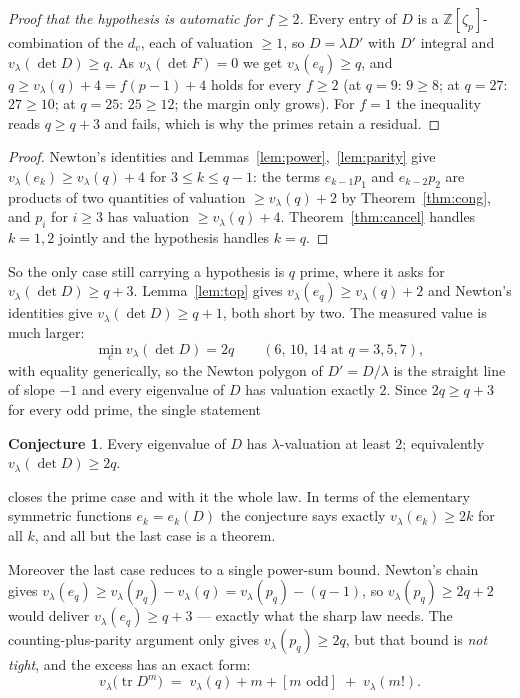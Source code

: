 \documentclass[11pt]{article}
\theoremstyle{plain}
\theoremstyle{definition}
\newtheorem{conjecture}[theorem]{Conjecture}
\newcommand{\ZZ}{\mathbb Z}
\newcommand{\tr}{\operatorname{tr}}
\newcommand{\vlam}{v_\lambda}
\begin{document}
\begin{proof}[Proof that the hypothesis is automatic for $f\ge2$]
Every entry of $D$ is a $\ZZ[\zeta_p]$-combination of the $d_v$, each of
valuation $\ge1$, so $D=\lambda D'$ with $D'$ integral and
$\vlam(\det D)\ge q$. As $\vlam(\det F)=0$ we get $\vlam(e_q)\ge q$, and
$q\ge \vlam(q)+4=f(p-1)+4$ holds for every $f\ge2$ (at $q=9$: $9\ge8$; at
$q=27$: $27\ge10$; at $q=25$: $25\ge12$; the margin only grows). For $f=1$ the
inequality reads $q\ge q+3$ and fails, which is why the primes retain a
residual.
\end{proof}

\begin{proof}
Newton's identities and Lemmas~\ref{lem:power},~\ref{lem:parity} give
$\vlam(e_k)\ge\vlam(q)+4$ for $3\le k\le q-1$: the terms $e_{k-1}p_1$ and
$e_{k-2}p_2$ are products of two quantities of valuation $\ge\vlam(q)+2$ by
Theorem~\ref{thm:cong}, and $p_i$ for $i\ge3$ has valuation $\ge\vlam(q)+4$.
Theorem~\ref{thm:cancel} handles $k=1,2$ jointly and the hypothesis handles
$k=q$.
\end{proof}

So the only case still carrying a hypothesis is $q$ prime, where it asks for
$\vlam(\det D)\ge q+3$. Lemma~\ref{lem:top} gives $\vlam(e_q)\ge\vlam(q)+2$
and Newton's identities give $\vlam(\det D)\ge q+1$, both short by two. The
measured value is much larger:
\[
\min_c \vlam(\det D)=2q \qquad (6,\,10,\,14 \text{ at } q=3,5,7),
\]
with equality generically, so the Newton polygon of $D'=D/\lambda$ is the
straight line of slope $-1$ and every eigenvalue of $D$ has valuation exactly
$2$. Since $2q\ge q+3$ for every odd prime, the single statement

\begin{conjecture}\label{conj:top}
Every eigenvalue of $D$ has $\lambda$-valuation at least $2$; equivalently
$\vlam(\det D)\ge 2q$.
\end{conjecture}

\noindent closes the prime case and with it the whole law. In terms of the
elementary symmetric functions $e_k=e_k(D)$ the conjecture says exactly
$\vlam(e_k)\ge2k$ for all $k$, and all but the last case is a theorem.

Moreover the last case reduces to a single power-sum bound. Newton's chain
gives $\vlam(e_q)\ge\vlam(p_q)-\vlam(q)=\vlam(p_q)-(q-1)$, so
$\vlam(p_q)\ge2q+2$ would deliver $\vlam(e_q)\ge q+3$ --- exactly what the
sharp law needs. The counting-plus-parity argument only gives $\vlam(p_q)\ge2q$, but that bound
is \emph{not tight}, and the excess has an exact form:
\begin{equation}\label{eq:factorial}
\vlam\bigl(\tr D^m\bigr)\;=\;\vlam(q)+m+[m\text{ odd}]\;+\;\vlam(m!) .
\end{equation}
\end{document}
